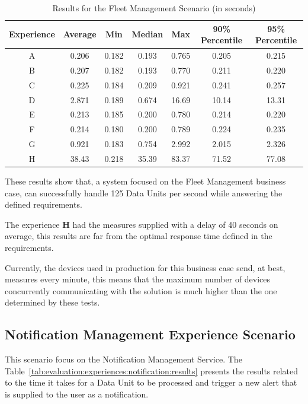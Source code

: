 \begin{table}[H]
    \caption{Results for the Fleet Management Scenario (in seconds)}
    \label{tab:evaluation:experiences:fleet:results}
    \centering
    \begin{tabular}{@{}ccccccc@{}}
    \toprule
    \textbf{Experience} & \textbf{Average} & \textbf{Min} & \textbf{Median} & \textbf{Max} & \textbf{90\% Percentile} & \textbf{95\% Percentile} \\ \midrule
    A & 0.206 & 0.182 & 0.193 & 0.765 & 0.205 & 0.215 \\ \midrule
    B & 0.207 & 0.182 & 0.193 & 0.770 & 0.211 & 0.220 \\ \midrule
    C & 0.225 & 0.184 & 0.209 & 0.921 & 0.241 & 0.257 \\ \midrule
    D & 2.871 & 0.189 & 0.674 & 16.69 & 10.14 & 13.31 \\ \midrule
    E & 0.213 & 0.185 & 0.200 & 0.780 & 0.214 & 0.220 \\ \midrule
    F & 0.214 & 0.180 & 0.200 & 0.789 & 0.224 & 0.235 \\ \midrule
    G & 0.921 & 0.183 & 0.754 & 2.992 & 2.015 & 2.326 \\ \midrule
    H & 38.43 & 0.218 & 35.39 & 83.37 & 71.52 & 77.08 \\ \bottomrule
    \end{tabular}
\end{table}

These results show that, a system focused on the Fleet Management business case, can successfully handle 125 Data Units per second while answering the defined requirements.

The experience \textbf{H} had the measures supplied with a delay of 40 seconds on average, this results are far from the optimal response time defined in the requirements.

Currently, the devices used in production for this business case send, at best, measures every minute, this means that the maximum number of devices concurrently communicating with the solution is much higher than the one determined by these tests.

\subsection{Notification Management Experience Scenario}
\label{subsec:evaluation:experiences:notification}

This scenario focus on the Notification Management Service. The Table~\ref{tab:evaluation:experiences:notification:results} presents the results related to the time it takes for a Data Unit to be processed and trigger a new alert that is  supplied to the user as a notification.

